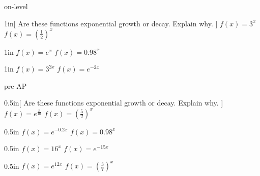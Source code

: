 \begin{taggedblock}{on-level}
    \begin{my2Problems}{1in}[%
        Are these functions exponential growth or decay. Explain why.
    ]
    {
        $f(x) = 3^{x}$
    }
    {
        $f(x) = \left(\frac{1}{2}\right)^x$
    }
    \end{my2Problems}
    \begin{my2Problems}{1in}
    {
        $f(x) = e^{x}$
    }
    {
        $f(x) = 0.98^x$
    }
    \end{my2Problems}
    \begin{my2Problems}{1in}
        {
            $f(x) = 3^{2x}$
        }
        {
            $f(x) = e^{-2x}$
        }
    \end{my2Problems}
\end{taggedblock}
\begin{taggedblock}{pre-AP}
    \begin{my2Problems}{0.5in}[%
        Are these functions exponential growth or decay. Explain why.
    ]
    {
        $f(x) = e^{\frac{x}{10}}$
    }
    {
        $f(x) = \left(\frac{5}{2}\right)^x$
    }
    \end{my2Problems}
    \begin{my2Problems}{0.5in}
    {
        $f(x) = e^{-0.2x}$
    }
    {
        $f(x) = 0.98^x$
    }
    \end{my2Problems}
    \begin{my2Problems}{0.5in}
        {
            $f(x) = 16^{x}$
        }
        {
            $f(x) = e^{-15x}$
        }
    \end{my2Problems}
    \begin{my2Problems}{0.5in}
        {
            $f(x) = e^{12x}$
        }
        {
            $f(x) = \left(\frac{3}{7}\right)^{x}$
        }
    \end{my2Problems}
\end{taggedblock}
       